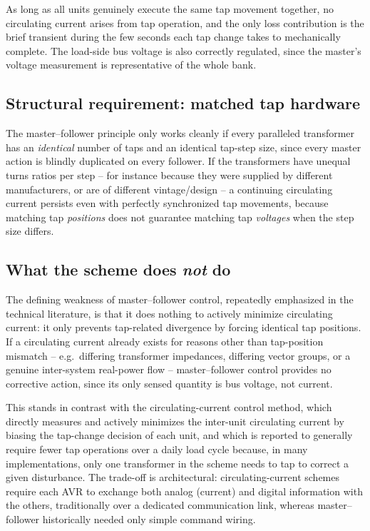 \documentclass[11pt,a4paper]{article}
\begin{document}
As long as all units genuinely execute the same tap movement together, no circulating current arises from tap operation, and the only loss contribution is the brief transient during the few seconds each tap change takes to mechanically complete. The load-side bus voltage is also correctly regulated, since the master's voltage measurement is representative of the whole bank.

\subsection{Structural requirement: matched tap hardware}

The master--follower principle only works cleanly if every paralleled transformer has an \emph{identical} number of taps and an identical tap-step size, since every master action is blindly duplicated on every follower. If the transformers have unequal turns ratios per step -- for instance because they were supplied by different manufacturers, or are of different vintage/design -- a continuing circulating current persists even with perfectly synchronized tap movements, because matching tap \emph{positions} does not guarantee matching tap \emph{voltages} when the step size differs.

\subsection{What the scheme does \emph{not} do}

The defining weakness of master--follower control, repeatedly emphasized in the technical literature, is that it does nothing to actively minimize circulating current: it only prevents tap-related divergence by forcing identical tap positions. If a circulating current already exists for reasons other than tap-position mismatch -- e.g.\ differing transformer impedances, differing vector groups, or a genuine inter-system real-power flow -- master--follower control provides no corrective action, since its only sensed quantity is bus voltage, not current.

This stands in contrast with the circulating-current control method, which directly measures and actively minimizes the inter-unit circulating current by biasing the tap-change decision of each unit, and which is reported to generally require fewer tap operations over a daily load cycle because, in many implementations, only one transformer in the scheme needs to tap to correct a given disturbance. The trade-off is architectural: circulating-current schemes require each AVR to exchange both analog (current) and digital information with the others, traditionally over a dedicated communication link, whereas master--follower historically needed only simple command wiring.
\end{document}
